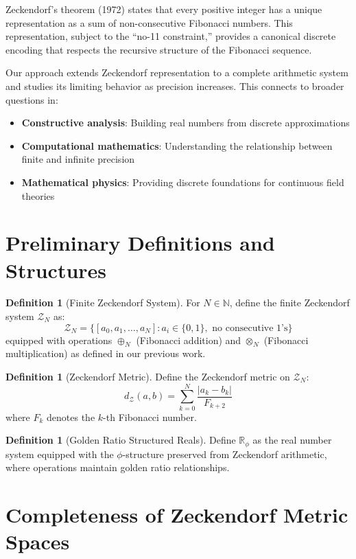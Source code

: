 \documentclass[12pt]{article}
\theoremstyle{plain}
\theoremstyle{definition}
\newtheorem{definition}[theorem]{Definition}
\begin{document}
Zeckendorf's theorem (1972) states that every positive integer has a unique representation as a sum of non-consecutive Fibonacci numbers. This representation, subject to the ``no-11 constraint,'' provides a canonical discrete encoding that respects the recursive structure of the Fibonacci sequence.

Our approach extends Zeckendorf representation to a complete arithmetic system and studies its limiting behavior as precision increases. This connects to broader questions in:
\begin{itemize}
\item \textbf{Constructive analysis}: Building real numbers from discrete approximations
\item \textbf{Computational mathematics}: Understanding the relationship between finite and infinite precision
\item \textbf{Mathematical physics}: Providing discrete foundations for continuous field theories
\end{itemize}

\section{Preliminary Definitions and Structures}

\begin{definition}[Finite Zeckendorf System]
For $N \in \mathbb{N}$, define the finite Zeckendorf system $\mathcal{Z}_N$ as:
$$\mathcal{Z}_N = \{[a_0, a_1, \ldots, a_N] : a_i \in \{0,1\}, \text{ no consecutive 1's}\}$$
equipped with operations $\oplus_N$ (Fibonacci addition) and $\otimes_N$ (Fibonacci multiplication) as defined in our previous work.
\end{definition}

\begin{definition}[Zeckendorf Metric]
Define the Zeckendorf metric on $\mathcal{Z}_N$:
$$d_{\mathcal{Z}}(a, b) = \sum_{k=0}^{N} \frac{|a_k - b_k|}{F_{k+2}}$$
where $F_k$ denotes the $k$-th Fibonacci number.
\end{definition}

\begin{definition}[Golden Ratio Structured Reals]
Define $\mathbb{R}_\phi$ as the real number system equipped with the $\phi$-structure preserved from Zeckendorf arithmetic, where operations maintain golden ratio relationships.
\end{definition}

\section{Completeness of Zeckendorf Metric Spaces}
\end{document}

